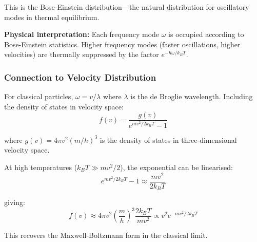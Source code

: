 This is the Bose-Einstein distribution—the natural distribution for oscillatory modes in thermal equilibrium.

\textbf{Physical interpretation:} Each frequency mode $\omega$ is occupied according to Bose-Einstein statistics. Higher frequency modes (faster oscillations, higher velocities) are thermally suppressed by the factor $e^{-\hbar\omega/k_B T}$.

\subsubsection{Connection to Velocity Distribution}

For classical particles, $\omega = v/\lambda$ where $\lambda$ is the de Broglie wavelength. Including the density of states in velocity space:
\begin{equation}
f(v) = \frac{g(v)}{e^{mv^2/2k_B T} - 1}
\end{equation}

where $g(v) = 4\pi v^2 (m/h)^3$ is the density of states in three-dimensional velocity space.

At high temperatures ($k_B T \gg mv^2/2$), the exponential can be linearised:
\begin{equation}
e^{mv^2/2k_B T} - 1 \approx \frac{mv^2}{2k_B T}
\end{equation}

giving:
\begin{equation}
f(v) \approx 4\pi v^2 \left(\frac{m}{h}\right)^3 \frac{2k_B T}{mv^2} \propto v^2 e^{-mv^2/2k_B T}
\end{equation}

This recovers the Maxwell-Boltzmann form in the classical limit.

